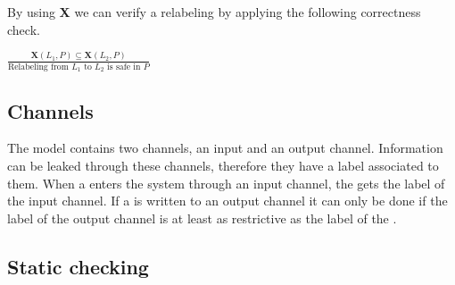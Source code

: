 By using \textbf{X} we can verify a relabeling by applying the following correctness check.
\begin{definition}
  $\frac{\textbf{X}(L_1, P)\subseteq \textbf{X}(L_2,P)}{\text{Relabeling from } L_1 \text{ to } L_2 \text{ is safe in } P }$
\end{definition}

\subsection{Channels}
The model contains two channels, an input and an output channel.
Information can be leaked through these channels, therefore they have a label associated to them.
When a \xvalue{} enters the system through an input channel, the \xvalue{} gets the label of the input channel.
If a \xvalue{} is written to an output channel it can only be done if the label of the output channel is at least as restrictive as the label of the \xvalue{}.

\subsection{Static checking}
